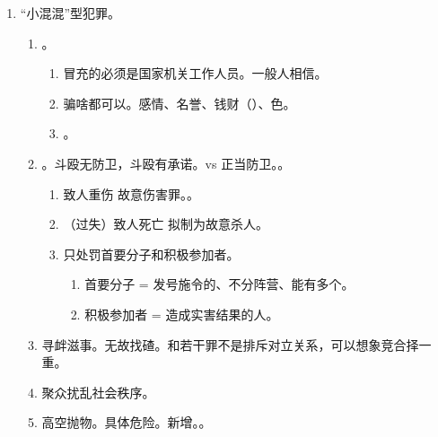 \begin{enumerate}
\begin{enumerate}
\begin{enumerate}
                \end{enumerate}
          \item 伪造公司、企业、事业单位、人民团体印章。只有伪造，弱保护。。
          \item {}。特殊的国家证件，独立出来。。
          \item 盗窃、抢夺、毁灭国家机关公文、证件、印章。
          \item 冒名顶替。新增。上、公、安。上大学资格、公务员录用、就业安置待遇。。
        \end{enumerate}
  \item “小混混”型犯罪。
        \begin{enumerate}
          \item {}。
                \begin{enumerate}
                  \item 冒充的必须是国家机关工作人员。一般人相信。
                  \item 骗啥都可以。感情、名誉、钱财（）、色。
                  \item {}。
                \end{enumerate}
          \item {}。斗殴无防卫，斗殴有承诺。vs 正当防卫。。
                \begin{enumerate}
                  \item 致人重伤 \yjt 故意伤害罪。。
                  \item （过失）致人死亡 \yjt 拟制为故意杀人。
                  \item 只处罚首要分子和积极参加者。
                        \begin{enumerate}
                          \item 首要分子 = 发号施令的、不分阵营、能有多个。
                          \item 积极参加者 = 造成实害结果的人。
                        \end{enumerate}
                \end{enumerate}
          \item 寻衅滋事。无故找碴。和若干罪不是排斥对立关系，可以想象竞合择一重。
          \item 聚众扰乱社会秩序。
          \item 高空抛物。具体危险。新增。。

\end{enumerate}
\end{enumerate}
